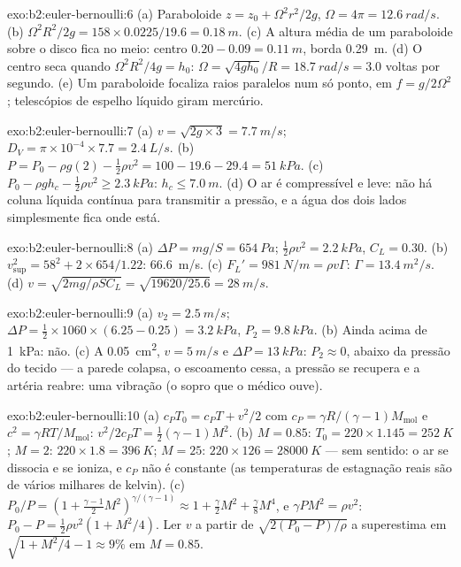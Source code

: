 \begin{solution}{exo:b2:euler-bernoulli:6}
(a) Paraboloide $z = z_0 + \Omega^2r^2/2g$, $\Omega = 4\pi = \qty{12.6}{rad/s}$. (b)
$\Omega^2R^2/2g = 158 \times 0.0225/19.6 = \qty{0.18}{m}$. (c) A altura média de um
paraboloide sobre o disco fica no meio: centro $0.20 - 0.09 = \qty{0.11}{m}$, borda
\qty{0.29}{m}. (d) O centro seca quando $\Omega^2R^2/4g = h_0$: $\Omega = \sqrt{4gh_0}/R =
\qty{18.7}{rad/s} = 3.0$ voltas por segundo. (e) Um paraboloide focaliza
raios paralelos num só ponto, em $f = g/2\Omega^2$; telescópios de espelho líquido
giram mercúrio.
\end{solution}

\begin{solution}{exo:b2:euler-bernoulli:7}
(a) $v = \sqrt{2g \times 3} = \qty{7.7}{m/s}$; $D_V = \pi \times 10^{-4} \times 7.7 =
\qty{2.4}{L/s}$. (b) $P = P_0 - \rho g(2) - \tfrac12\rho v^2 = 100 - 19.6 - 29.4 =
\qty{51}{kPa}$. (c) $P_0 - \rho gh_c - \tfrac12\rho v^2 \ge \qty{2.3}{kPa}$: $h_c \le
\qty{7.0}{m}$. (d) O ar é compressível e leve: não há coluna líquida
contínua para transmitir a pressão, e a água dos dois lados simplesmente fica onde está.
\end{solution}

\begin{solution}{exo:b2:euler-bernoulli:8}
(a) $\Delta P = mg/S = \qty{654}{Pa}$; $\tfrac12\rho v^2 = \qty{2.2}{kPa}$, $C_L = 0.30$.
(b) $v_{\text{sup}}^2 = 58^2 + 2 \times 654/1.22$: \qty{66.6}{m/s}. (c) $F_L' =
\qty{981}{N/m} = \rho v\Gamma$: $\Gamma = \qty{13.4}{m^2/s}$. (d) $v = \sqrt{2mg/
\rho SC_L} = \sqrt{19620/25.6} = \qty{28}{m/s}$.
\end{solution}

\begin{solution}{exo:b2:euler-bernoulli:9}
(a) $v_2 = \qty{2.5}{m/s}$; $\Delta P = \tfrac12 \times 1060 \times (6.25 - 0.25) =
\qty{3.2}{kPa}$, $P_2 = \qty{9.8}{kPa}$. (b) Ainda acima de \qty{1}{kPa}: não. (c) A
\qty{0.05}{cm^2}, $v = \qty{5}{m/s}$ e $\Delta P = \qty{13}{kPa}$: $P_2 \approx 0$, abaixo
da pressão do tecido --- a parede colapsa, o escoamento cessa, a
pressão se recupera e a artéria reabre: uma vibração (o sopro que o médico ouve).
\end{solution}

\begin{solution}{exo:b2:euler-bernoulli:10}
(a) $c_PT_0 = c_PT + v^2/2$ com $c_P = \gamma R/(\gamma - 1)M_{\text{mol}}$ e
$c^2 = \gamma RT/M_{\text{mol}}$: $v^2/2c_PT = \tfrac12(\gamma - 1)M^2$. (b) $M =
0.85$: $T_0 = 220 \times 1.145 = \qty{252}{K}$; $M = 2$: $220 \times 1.8 = \qty{396}{K}$;
$M = 25$: $220 \times 126 = \qty{28000}{K}$ --- sem sentido: o ar se dissocia
e se ioniza, e $c_P$ não é constante (as temperaturas de estagnação reais são
de vários milhares de kelvin). (c) $P_0/P = (1 + \tfrac{\gamma - 1}2M^2)^{\gamma/(\gamma
- 1)} \approx 1 + \tfrac{\gamma}2M^2 + \tfrac{\gamma}8M^4$, e $\gamma PM^2 = \rho v^2$:
$P_0 - P = \tfrac12\rho v^2(1 + M^2/4)$. Ler $v$ a partir de $\sqrt{2(P_0 - P)/\rho}$
a superestima em $\sqrt{1 + M^2/4} - 1 \approx 9\%$ em $M = 0.85$.
\end{solution}

